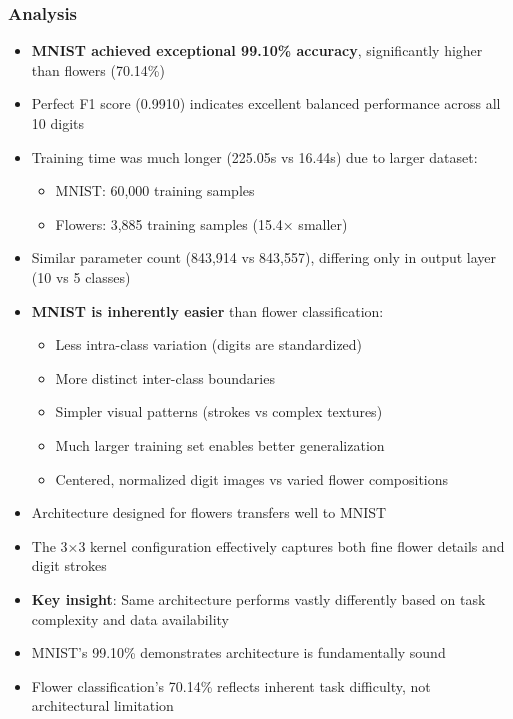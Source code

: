 \documentclass[12pt,a4paper]{article}
\begin{document}
\subsubsection{Analysis}
\begin{itemize}
    \item \textbf{MNIST achieved exceptional 99.10\% accuracy}, significantly higher than flowers (70.14\%)
    \item Perfect F1 score (0.9910) indicates excellent balanced performance across all 10 digits
    \item Training time was much longer (225.05s vs 16.44s) due to larger dataset:
    \begin{itemize}
        \item MNIST: 60,000 training samples
        \item Flowers: 3,885 training samples (15.4× smaller)
    \end{itemize}
    \item Similar parameter count (843,914 vs 843,557), differing only in output layer (10 vs 5 classes)
    \item \textbf{MNIST is inherently easier} than flower classification:
    \begin{itemize}
        \item Less intra-class variation (digits are standardized)
        \item More distinct inter-class boundaries
        \item Simpler visual patterns (strokes vs complex textures)
        \item Much larger training set enables better generalization
        \item Centered, normalized digit images vs varied flower compositions
    \end{itemize}
    \item Architecture designed for flowers transfers well to MNIST
    \item The 3×3 kernel configuration effectively captures both fine flower details and digit strokes
    \item \textbf{Key insight}: Same architecture performs vastly differently based on task complexity and data availability
    \item MNIST's 99.10\% demonstrates architecture is fundamentally sound
    \item Flower classification's 70.14\% reflects inherent task difficulty, not architectural limitation
\end{itemize}
\end{document}
